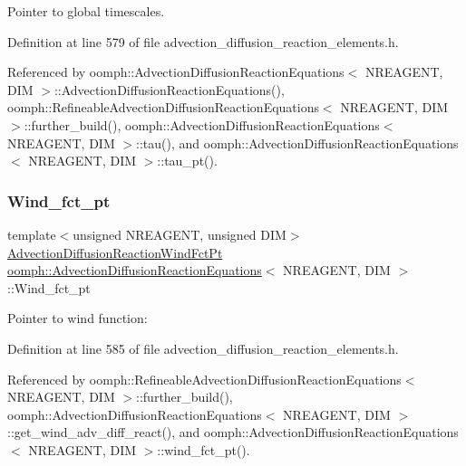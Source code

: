 Pointer to global timescales. 



Definition at line 579 of file advection\+\_\+diffusion\+\_\+reaction\+\_\+elements.\+h.



Referenced by oomph\+::\+Advection\+Diffusion\+Reaction\+Equations$<$ N\+R\+E\+A\+G\+E\+N\+T, D\+I\+M $>$\+::\+Advection\+Diffusion\+Reaction\+Equations(), oomph\+::\+Refineable\+Advection\+Diffusion\+Reaction\+Equations$<$ N\+R\+E\+A\+G\+E\+N\+T, D\+I\+M $>$\+::further\+\_\+build(), oomph\+::\+Advection\+Diffusion\+Reaction\+Equations$<$ N\+R\+E\+A\+G\+E\+N\+T, D\+I\+M $>$\+::tau(), and oomph\+::\+Advection\+Diffusion\+Reaction\+Equations$<$ N\+R\+E\+A\+G\+E\+N\+T, D\+I\+M $>$\+::tau\+\_\+pt().

\mbox{\label{classoomph_1_1AdvectionDiffusionReactionEquations_aa45dd8734c1d321329c522b6db8d0590}} 
\subsubsection{\texorpdfstring{Wind\+\_\+fct\+\_\+pt}{Wind\_fct\_pt}}
{\footnotesize\ttfamily template$<$unsigned N\+R\+E\+A\+G\+E\+NT, unsigned D\+IM$>$ \\
\hyperlink{classoomph_1_1AdvectionDiffusionReactionEquations_a2fff621b5b44c64bd5b3f0412201055f}{Advection\+Diffusion\+Reaction\+Wind\+Fct\+Pt} \hyperlink{classoomph_1_1AdvectionDiffusionReactionEquations}{oomph\+::\+Advection\+Diffusion\+Reaction\+Equations}$<$ N\+R\+E\+A\+G\+E\+NT, D\+IM $>$\+::Wind\+\_\+fct\+\_\+pt\hspace{0.3cm}{\ttfamily [protected]}}



Pointer to wind function\+: 



Definition at line 585 of file advection\+\_\+diffusion\+\_\+reaction\+\_\+elements.\+h.



Referenced by oomph\+::\+Refineable\+Advection\+Diffusion\+Reaction\+Equations$<$ N\+R\+E\+A\+G\+E\+N\+T, D\+I\+M $>$\+::further\+\_\+build(), oomph\+::\+Advection\+Diffusion\+Reaction\+Equations$<$ N\+R\+E\+A\+G\+E\+N\+T, D\+I\+M $>$\+::get\+\_\+wind\+\_\+adv\+\_\+diff\+\_\+react(), and oomph\+::\+Advection\+Diffusion\+Reaction\+Equations$<$ N\+R\+E\+A\+G\+E\+N\+T, D\+I\+M $>$\+::wind\+\_\+fct\+\_\+pt().



